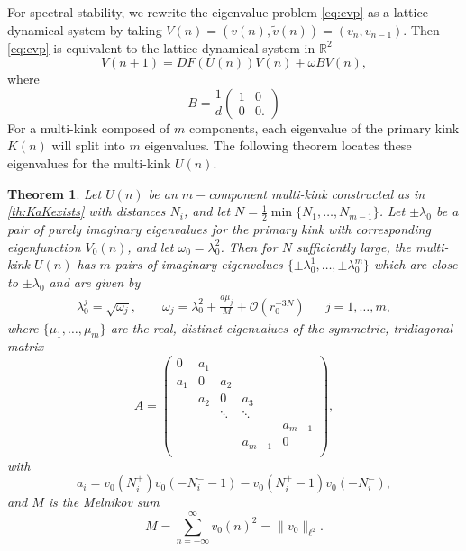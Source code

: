 \documentclass[12pt]{article}
\def\R{{\mathbb R}}
\newtheorem{theorem}{Theorem}
\begin{document}
For spectral stability, we rewrite the eigenvalue problem \cref{eq:evp} as a lattice dynamical system by taking $V(n) = (v(n), \tilde{v}(n)) = (v_n, v_{n-1})$. Then \cref{eq:evp} is equivalent to the lattice dynamical system in $\R^2$
\begin{equation}\label{eq:EVPdyneq}
V(n+1) = D F( U(n) )V(n) + \omega B V(n),
\end{equation}
where
\[
B = \frac{1}{d}
\begin{pmatrix}1 & 0 \\ 0 & 0.
\end{pmatrix}
\] 
For a multi-kink composed of $m$ components, each eigenvalue of the primary kink $K(n)$ will split into $m$ eigenvalues. The following theorem locates these eigenvalues for the multi-kink $U(n)$.

\begin{theorem}\label{th:stability}
Let $U(n)$ be an $m-$component multi-kink constructed as in \cref{th:KaKexists} with distances $N_i$, and let $N = \frac{1}{2} \min\{ N_1, \dots, N_{m-1}\}$. Let $\pm \lambda_0$ be a pair of purely imaginary eigenvalues for the primary kink with corresponding eigenfunction $V_0(n)$, and let $\omega_0 = \lambda_0^2$. Then for $N$ sufficiently large, the multi-kink $U(n)$ has $m$ pairs of imaginary eigenvalues $\{\pm \lambda_0^1, \dots, \pm \lambda_0^m \}$ which are close to $\pm \lambda_0$ and are given by
\begin{align}\label{eq:lambdaj}
	\lambda_0^j = \sqrt{\omega_j}, \qquad
	\omega_j = \lambda_0^2 + \frac{d \mu_j}{M} + \mathcal{O}(r_0^{-3N}) && j = 1, \dots, m,
\end{align}
where $\{ \mu_1, \dots, \mu_m \}$ are the real, distinct eigenvalues of the symmetric, tridiagonal matrix
\begin{equation}\label{eq:matrixA}
	A = \begin{pmatrix}
	0 & a_1 & & & \\
	a_1 & 0 & a_2 \\
	& a_2 & 0 & a_3 \\
	& & \ddots & \ddots & \\
	& & & & a_{m-1}  \\
	& & & a_{m-1} & 0  \\
	\end{pmatrix},
\end{equation}
with 
\begin{equation}\label{eq:ai}
	a_i = v_0(N_i^+)v_0(-N_i^- - 1) - v_0(N_i^+ - 1)v_0(-N_i^-),
\end{equation}
and $M$ is the Melnikov sum
\begin{equation}\label{eq:Minth}
	M = \sum_{n = -\infty}^{\infty} v_0(n)^2 = \| v_0 \|_{\ell^2}.
	\end{equation}
\end{theorem}
\end{document}
